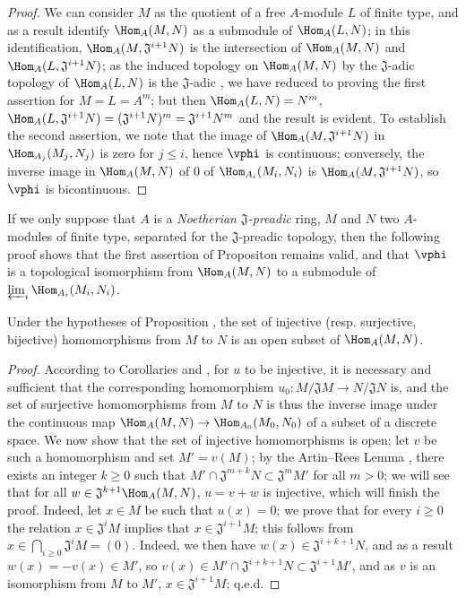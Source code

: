 \begin{proof}
\label{proof-0.7.8.2}
We can consider $M$ as the quotient of a free $A$-module $L$ of finite type, and as a result identify $\Hom_A(M,N)$ as a submodule of $\Hom_A(L,N)$; in this identification,
$\Hom_A(M,\mathfrak{J}^{i+1}N)$ is the intersection of $\Hom_A(M,N)$ and
$\Hom_A(L,\mathfrak{J}^{i+1}N)$; as the induced topology on $\Hom_A(M,N)$ by the $\mathfrak{J}$-adic
topology of $\Hom_A(L,N)$ is the $\mathfrak{J}$-adic , we have
reduced to proving the first assertion
for $M=L=A^m$; but then $\Hom_A(L,N)=N^m$,
$\Hom_A(L,\mathfrak{J}^{i+1}N)=(\mathfrak{J}^{i+1}N)^m=\mathfrak{J}^{i+1}N^m$ and the result is
evident. To establish the second assertion, we note that the image of $\Hom_A(M,\mathfrak{J}^{i+1}N)$
in $\Hom_{A_j}(M_j,N_j)$ is zero for $j\leq i$, hence $\vphi$ is continuous; conversely, the
inverse image in $\Hom_A(M,N)$ of $0$ of $\Hom_{A_i}(M_i,N_i)$ is $\Hom_A(M,\mathfrak{J}^{i+1}N)$,
so $\vphi$ is bicontinuous.
\end{proof}

If we only suppose that $A$ is a \emph{Noetherian $\mathfrak{J}$-preadic} ring, $M$ and $N$ two
$A$-modules of finite type, separated for the $\mathfrak{J}$-preadic topology, then the
following proof shows that the first assertion of Propositon  remains
valid, and that $\vphi$ is a topological isomorphism from $\Hom_A(M,N)$ to a submodule of
$\varprojlim_i\Hom_{A_i}(M_i,N_i)$.

\begin{proposition}[7.8.3]
\label{0.7.8.3}
Under the hypotheses of Proposition , the set of injective
(resp. surjective, bijective) homomorphisms from $M$ to $N$ is an open subset of $\Hom_A(M,N)$.
\end{proposition}

\begin{proof}
\label{proof-0.7.8.3}
According to Corollaries  and , for
$u$ to be injective, it is necessary and sufficient that the corresponding homomorphism
$u_0:M/\mathfrak{J}M\to N/\mathfrak{J}N$ is, and the set of surjective homomorphisms from $M$ to $N$
is thus the inverse image under the continuous map $\Hom_A(M,N)\to\Hom_{A_0}(M_0,N_0)$ of a subset
of a discrete space. We now show that the set of injective homomorphisms is open; let $v$ be such a
homomorphism and set $M'=v(M)$; by the Artin--Rees Lemma , there exists
an integer $k\geq 0$ such that $M'\cap\mathfrak{J}^{m+k}N\subset\mathfrak{J}^m M'$ for all
$m>0$; we will see that for all $w\in\mathfrak{J}^{k+1}\Hom_A(M,N)$, $u=v+w$ is injective, which
will finish the proof. Indeed, let $x\in M$ be such that $u(x)=0$; we prove that for every
$i\geq 0$ the relation $x\in\mathfrak{J}^i M$ implies that $x\in\mathfrak{J}^{i+1}M$; this
follows from $x\in\bigcap_{i\geq 0}\mathfrak{J}^i M=(0)$. Indeed, we then have
$w(x)\in\mathfrak{J}^{i+k+1}N$, and as a result $w(x)=-v(x)\in M'$, so
$v(x)\in M'\cap\mathfrak{J}^{i+k+1}N\subset\mathfrak{J}^{i+1}M'$, and as $v$ is an isomorphism from
$M$ to $M'$, $x\in\mathfrak{J}^{i+1}M$; q.e.d.
\end{proof}

